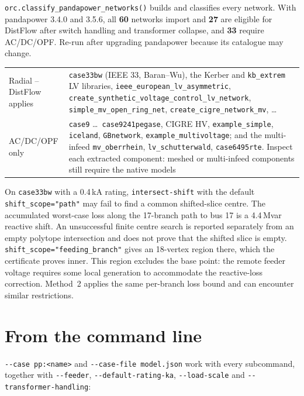 \documentclass[11pt,a4paper]{report}
\newcommand{\trap}[1]{\begin{warnbox}#1\end{warnbox}}
\newcommand{\code}[1]{\texttt{\small #1}}
\begin{document}
\code{orc.classify\_pandapower\_networks()} builds and classifies every network.
With pandapower 3.4.0 and 3.5.6, all \textbf{60} networks import and
\textbf{27} are eligible for DistFlow
after switch handling and transformer collapse, and \textbf{33} require
AC/DC/OPF. Re-run after upgrading pandapower because its catalogue may change.

\begin{center}\small
\begin{tabular}{@{}lp{9.6cm}@{}}
\toprule
Radial -- DistFlow applies & \code{case33bw} (IEEE 33, Baran--Wu), the Kerber and
  \code{kb\_extrem} LV libraries, \code{ieee\_european\_lv\_asymmetric},
  \code{create\_synthetic\_voltage\_control\_lv\_network},
  \code{simple\_mv\_open\_ring\_net}, \code{create\_cigre\_network\_mv}, \dots \\[3pt]
AC/DC/OPF only & \code{case9} \dots\ \code{case9241pegase}, CIGRE HV,
  \code{example\_simple},
  \code{iceland}, \code{GBnetwork}, \code{example\_multivoltage}; and the
  multi-infeed \code{mv\_oberrhein}, \code{lv\_schutterwald},
  \code{case6495rte}. Inspect each extracted component: meshed or
  multi-infeed components still require the native models \\
\bottomrule
\end{tabular}
\end{center}

\trap{On \code{case33bw} with a 0.4\,kA
rating, \code{intersect-shift} with the default \code{shift\_scope="path"}
may fail to find a common shifted-slice centre. The accumulated worst-case
loss along the 17-branch path to bus 17 is a 4.4\,Mvar reactive shift.
An unsuccessful finite centre search is reported separately from an empty
polytope intersection and does not prove that the shifted slice is empty.
\code{shift\_scope="feeding\_branch"}
gives an 18-vertex region there, which the certificate proves inner. This region
excludes the base point: the remote feeder voltage requires some local
generation to accommodate the reactive-loss correction. Method~2 applies the
same per-branch loss bound and can encounter similar restrictions.}

\section{From the command line}

\code{-{}-case pp:<name>} and \code{-{}-case-file model.json} work with every
subcommand, together with \code{-{}-feeder}, \code{-{}-default-rating-ka},
\code{-{}-load-scale} and \code{-{}-transformer-handling}:
\end{document}
